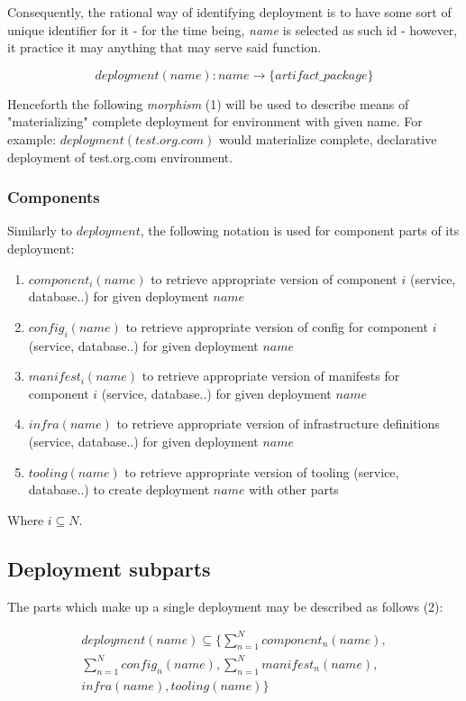 \documentclass{article}
\begin{document}
Consequently, the rational way of identifying deployment is to have some sort of unique identifier for it - for the time being, \emph{name} is selected as such id - however, it practice it may anything that may serve said function.

\begin{equation}
	deployment(name): name \rightarrow \{artifact\_package\}
\end{equation}

Henceforth the following \emph{morphism} (1) will be used to describe means of "materializing" complete deployment for environment with given name. For example: $deployment(test.org.com)$ would materialize complete, declarative deployment of test.org.com environment.

\subsubsection{Components}
Similarly to $deployment$, the following notation is used for component parts of its deployment:

\begin{enumerate}
	\item $component_i(name)$ to retrieve appropriate version of component $i$ (service, database..) for given deployment $name$
	\item $config_i(name)$ to retrieve appropriate version of config for component $i$ (service, database..) for given deployment $name$
	\item $manifest_i(name)$ to retrieve appropriate version of manifests for component $i$ (service, database..) for given deployment $name$
	\item $infra(name)$ to retrieve appropriate version of infrastructure definitions (service, database..) for given deployment $name$
	\item $tooling(name)$ to retrieve appropriate version of tooling (service, database..) to create deployment $name$ with other parts
\end{enumerate}

Where $i \subseteq N$.

\subsection{Deployment subparts}

The parts which make up a single deployment may be described as follows (2):

\begin{equation}
	\begin{split}
		deployment(name) \subseteq \{ \sum_{n=1}^{N} component_n(name), \\
			\sum_{n=1}^{N} config_n(name), \sum_{n=1}^{N} manifest_n(name), \\
			infra(name), tooling(name) \}
	\end{split}
\end{equation}
\end{document}
